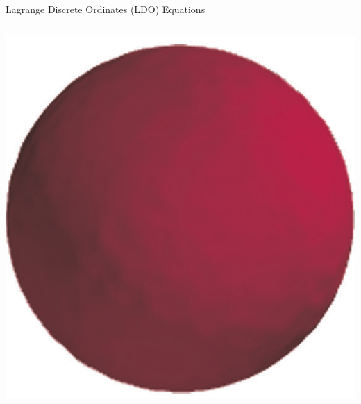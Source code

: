 \documentclass{beamer}
\begin{document}
\begin{frame}{Lagrange Discrete Ordinates (LDO) Equations \nocite{ahrens}}
\begin{columns}
\begin{column}{0.4\textwidth}
\includegraphics[width=\textwidth,natwidth=568,natheight=589]{img/ray-effects-fine-ldo.png}
\end{column}
\end{columns}
%
\end{frame}
\end{document}
